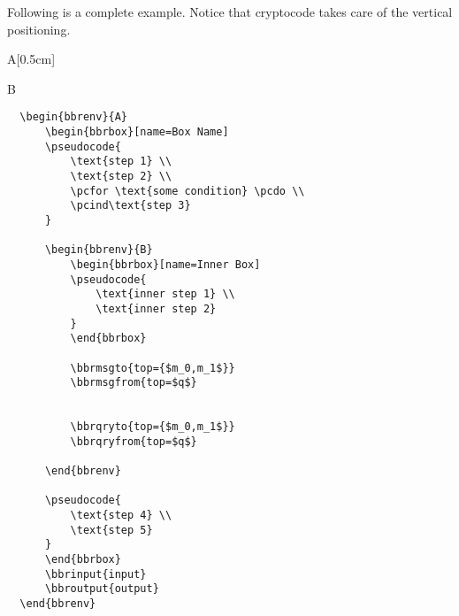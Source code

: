\documentclass[a4paper]{report}
\begin{document}
  Following is a complete example. Notice that cryptocode takes care of the vertical positioning.
  
  \begin{bbrenv}[1cm]{A}[0.5cm]
	  \begin{bbrbox}[name=Box Name]
  
	  \begin{bbrenv}{B}
		  \begin{bbrbox}[name=Inner Box]
		  \end{bbrbox}
		  
  
  
  
	  \end{bbrenv}
  
	  \end{bbrbox}
  \end{bbrenv}
  
  \begin{lstlisting}
  \begin{bbrenv}{A}
	  \begin{bbrbox}[name=Box Name]
	  \pseudocode{
		  \text{step 1} \\
		  \text{step 2} \\
		  \pcfor \text{some condition} \pcdo \\
		  \pcind\text{step 3} 
	  }
  
	  \begin{bbrenv}{B}
		  \begin{bbrbox}[name=Inner Box]
		  \pseudocode{
			  \text{inner step 1} \\
			  \text{inner step 2} 
		  }
		  \end{bbrbox}
		  
		  \bbrmsgto{top={$m_0,m_1$}}
		  \bbrmsgfrom{top=$q$}
  
  
		  \bbrqryto{top={$m_0,m_1$}}
		  \bbrqryfrom{top=$q$}
  
	  \end{bbrenv}
  
	  \pseudocode{
		  \text{step 4} \\
		  \text{step 5} 
	  }
	  \end{bbrbox}
	  \bbrinput{input}
	  \bbroutput{output}
  \end{bbrenv}
  \end{lstlisting}
  
\end{document}
